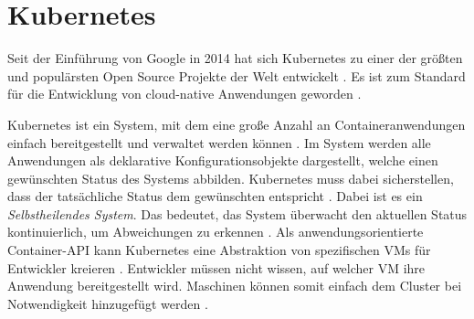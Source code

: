 \section{Kubernetes}
\label{sec:grundlagen:kubernetes}
Seit der Einführung von Google in 2014 hat sich Kubernetes zu einer der größten und populärsten 
Open Source Projekte der Welt entwickelt \cite{Burns2019}. Es ist zum Standard für die Entwicklung von cloud-native 
Anwendungen geworden \cite{Burns2019}. 

Kubernetes ist ein System, mit dem eine große Anzahl an Containeranwendungen einfach bereitgestellt und verwaltet werden können \cite{Marko2018}.
Im System werden alle Anwendungen als deklarative Konfigurationsobjekte dargestellt, welche einen gewünschten
Status des Systems abbilden. Kubernetes muss dabei sicherstellen, dass der tatsächliche Status dem gewünschten entspricht \cite{Burns2019}.
Dabei ist es ein \emph{Selbstheilendes System}.
Das bedeutet, das System überwacht den aktuellen Status kontinuierlich, um Abweichungen zu erkennen \cite{Burns2019}.
Als anwendungsorientierte Container-API kann Kubernetes eine Abstraktion von spezifischen \acp{VM} für Entwickler kreieren \cite{Burns2019}.
Entwickler müssen nicht wissen, auf welcher \ac{VM} ihre Anwendung bereitgestellt wird.
Maschinen können somit einfach dem Cluster bei Notwendigkeit hinzugefügt werden \cite{Burns2019}.